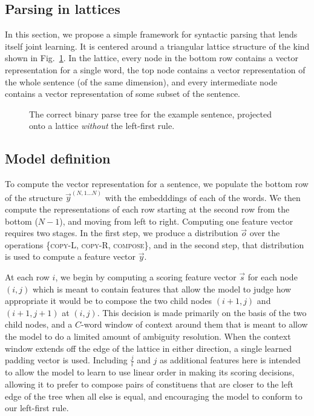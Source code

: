 \subsection{Parsing in lattices} 

In this section, we propose a simple framework for syntactic parsing that lends itself joint learning. It is centered around a triangular lattice structure of the kind shown in Fig.~\ref{lattice-fig1}. In the lattice, every node in the bottom row contains a vector representation for a single word, the top node contains a vector representation of the whole sentence (of the same dimension), and every intermediate node contains a vector representation of some subset of the sentence.

\begin{figure}[tp]
  \centering\small
 	

        \caption{The correct binary parse tree for the example sentence, projected onto a lattice \textit{without} the left-first rule.}
  \label{lattice-fig1}
\end{figure}



\subsection{Model definition}

To compute the vector representation for a sentence, we populate the bottom row of the structure $\vec{y}^{(N,1...N)}$ with the embedddings of each of the words. We then compute the representations of each row starting at the second row from the bottom ($N - 1$), and moving from left to right. Computing one feature vector requires two stages. In the first step, we produce a distribution $\vec{o}$ over the operations \{\textsc{copy-L, copy-R, compose}\}, and in the second step, that distribution is used to compute a feature vector $\vec{y}$.

At each row $i$, we begin by computing a scoring feature vector $\vec{s}$ for each node $(i, j)$ which is meant to contain features that allow the model to judge how appropriate it would be to compose the two child nodes $(i+1, j)$ and $(i+1, j+1)$ at $(i, j)$. This decision is made primarily on the basis of the two child nodes, and a $C$-word window of context around them that is meant to allow the model to do a limited amount of ambiguity resolution. When the context window extends off the edge of the lattice in either direction, a single learned padding vector is used. %
Including $\frac{j}{i}$ and $j$ as additional features here is intended to allow the model to learn to use linear order in making its scoring decisions, allowing it to prefer to compose pairs of constituens that are closer to the left edge of the tree when all else is equal, and encouraging the model to conform to our left-first rule.

